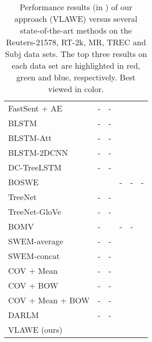 \documentclass[11pt,a4paper]{article}
\begin{document}
\begin{table*}[!t]
\begin{center}
\begin{tabular}{lccccc}
FastSent + AE \cite{Hill-NAACL-2016}	& - 					& - 						&  				& 				& \\

BLSTM \cite{Zhou-COLING-2016}					& - 			& -						&  				& 				& \\

BLSTM-Att \cite{Zhou-COLING-2016}			& - 			& - 						&  				& 				& \\

BLSTM-2DCNN \cite{Zhou-COLING-2016}	& - 			& - 						&  				& 	& \\

DC-TreeLSTM \cite{Liu-IJCAI-2017}				& - 			& - 						&  				& 				& \\

BOSWE \cite{Ionescu-KES-2017}		&  	&  	& - 	& -						& -\\

TreeNet \cite{Cheng-IJCAI-2018}		& - 						& -			 			&  				& 				& \\

TreeNet-GloVe \cite{Cheng-IJCAI-2018}	& - 				& -		&  	& 	& \\

BOMV \cite{Fu-ESA-2018}					& - 						&  	& - 			& -						& \\

SWEM-average \cite{Shen-ACL-2018}    & - 					& -			 			& 				& 				& \\

SWEM-concat \cite{Shen-ACL-2018}	& - 					& -			 			&  				& 				& \\

COV + Mean \cite{Torki-ACL-2018}	& - 						& -			 			&  				& 				& \\

COV + BOW \cite{Torki-ACL-2018}	& - 						& -			 			&  				& 				& \\

COV + Mean + BOW \cite{Torki-ACL-2018}	& - 			& - 						&  				& 				& \\

DARLM \cite{Zhou-IJCAI-2018}			& - 						& -			 	&  	& 	& \\
										
\hline
VLAWE (ours)	&  	&  	&  	& 	& \\
\hline
\end{tabular}
\end{center}
\vspace*{-0.2cm}
\caption{Performance results (in ) of our approach (VLAWE) versus several state-of-the-art methods \cite{Ionescu-KES-2017,Cheng-IJCAI-2018,Fu-ESA-2018,Hill-NAACL-2016,Iyyer-ACL-2015,Kim-EMNLP-2014,Kiros-NIPS-2015,Le-ICML-2014,Liu-IJCAI-2017,Shen-ACL-2018,Torki-ACL-2018,Xue-TKDE-2009,Zhao-IJCAI-2015,Zhou-COLING-2016,Zhou-IJCAI-2018} on the Reuters-21578, RT-2k, MR, TREC and Subj data sets. The top three results on each data set are highlighted in \textcolor{dark_red}{red}, \textcolor{dark_green}{green} and \textcolor{dark_blue}{blue}, respectively. Best viewed in color.}
\label{tab_VLAWE}
\vspace*{-0.3cm}
\end{table*}
\end{document}
